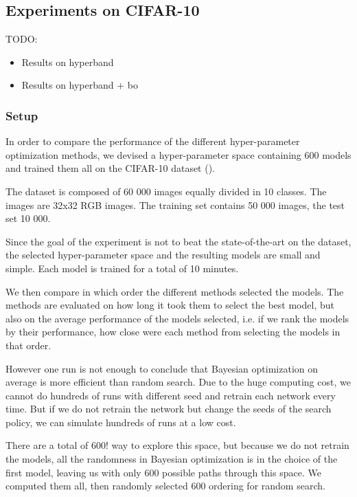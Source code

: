\subsection{Experiments on CIFAR-10}

TODO:
\begin{itemize}
    \item Results on hyperband
    \item Results on hyperband + bo
\end{itemize}

\subsubsection{Setup}

In order to compare the performance of the different hyper-parameter optimization methods, we devised a hyper-parameter space containing 600 models and trained them all on the CIFAR-10 dataset (\textcite{krizhevsky2009}).

The dataset is composed of 60 000 images equally divided in 10 classes. The images are 32x32 RGB images. The training set contains 50 000 images, the test set 10 000.

Since the goal of the experiment is not to beat the state-of-the-art on the dataset, the selected hyper-parameter space and the resulting models are small and simple. Each model is trained for a total of 10 minutes. 

We then compare in which order the different methods selected the models. The methods are evaluated on how long it took them to select the best model, but also on the average performance of the models selected, i.e. if we rank the models by their performance, how close were each method from selecting the models in that order.

However one run is not enough to conclude that Bayesian optimization on average is more efficient than random search. Due to the huge computing cost, we cannot do hundreds of runs with different seed and retrain each network every time. But if we do not retrain the network but change the seeds of the search policy, we can simulate hundreds of runs at a low cost. 

There are a total of $600!$ way to explore this space, but because we do not retrain the models, all the randomness in Bayesian optimization is in the choice of the first model, leaving us with only 600 possible paths through this space. We computed them all, then randomly selected 600 ordering for random search.

